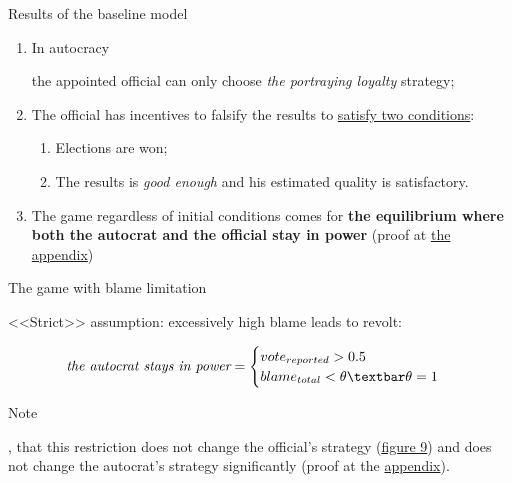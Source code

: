 \documentclass{beamer}
\begin{document}
\begin{frame}{Results of the baseline model}
    \begin{enumerate}
        
        \item \hypertarget{sum1}{In autocracy} the appointed official can only choose \textit{the portraying loyalty} strategy;
        
        \item The official has incentives to falsify the results to \hyperlink{officialtask}{satisfy two conditions}:
        
        \begin{enumerate}
            \item Elections are won; 
            
            \item The results is \textit{good enough} and his estimated quality is satisfactory.
        \end{enumerate}
        
        \item The game regardless of initial conditions comes for \textbf{the equilibrium where both the autocrat and the official stay in power} (proof at \hyperlink{app1}{the appendix})
        
    \end{enumerate}
\end{frame}


\begin{frame}{\hypertarget{game2}{The game with blame limitation}}
    
    <<Strict>> assumption: excessively high blame leads to revolt:
    
    $$\textit{the autocrat stays in power} =  \begin{cases}
        vote_{reported} > 0.5\\
        blame_{total} < \theta \textbar \theta = 1
	    \end{cases}$$
    
    \hypertarget{prestext2}{Note}, that this restriction does not change the official's strategy (\hyperlink{fig9}{figure 9}) and does not change the autocrat's strategy significantly (proof at the \hyperlink{app2}{appendix}).
    
    
\end{frame}
\end{document}
